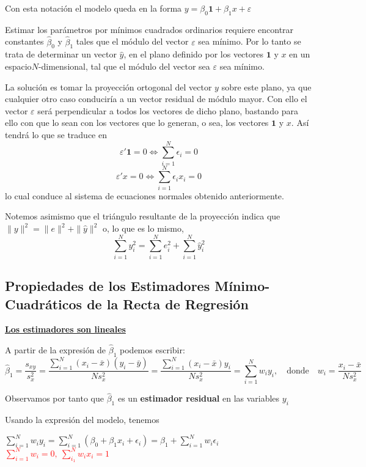 \documentclass[10pt,a4paper]{book}
\begin{document}
Con esta notación el modelo queda en la forma $y=\beta_0\mathbf{1}+\beta_1x+\varepsilon$

Estimar los parámetros por mínimos cuadrados ordinarios requiere encontrar constantes $\widehat{\beta}_0$ y $\widehat{\beta}_1$ tales que el módulo del vector $\varepsilon$ sea mínimo. Por lo tanto se trata de determinar un vector $\widehat{y}$, en el plano definido por los vectores $\mathbf{1}$ y $x$ en un espacio$N$-dimensional, tal que el módulo del vector sea $\varepsilon$ sea mínimo.

La solución es tomar la proyección ortogonal del vector $y$ sobre este plano, ya que cualquier otro caso conduciría a un vector residual de módulo mayor. Con ello el vector $\varepsilon$ será perpendicular a todos los vectores de dicho plano, bastando para ello con que lo sean con los vectores que lo generan, o sea, los vectores $\mathbf{1}$ y $x$. Así tendrá
lo que se traduce en $$\varepsilon'\mathbf{1}=0 \Leftrightarrow \sum^N_{i=1}\epsilon_i=0$$ $$\varepsilon'x=0 \Leftrightarrow \sum^N_{i=1}\epsilon_ix_i=0$$ lo cual conduce al sistema de ecuaciones normales obtenido anteriormente.

Notemos asimismo que el triángulo resultante de la proyección indica que $\parallel y\parallel^2=\parallel e\parallel ^2+\parallel \widehat{y}\parallel ^2$ o, lo que es lo mismo, $$\sum^N_{i=1}y^2_i=\sum^N_{i=1}e_i^2+\sum^N_{i=1}\widehat{y}_i^2$$
		\subsection{Propiedades de los Estimadores Mínimo-Cuadráticos de la Recta de Regresión}
\underline{\textbf{Los estimadores son lineales}}

A partir de la expresión de $\widehat{\beta}_1$ podemos escribir: $$\widehat{\beta}_1=\dfrac{s_{xy}}{s^2_x}=\dfrac{\displaystyle\sum^N_{i=1}(x_i-\bar{x})(y_i-\bar{y})}{Ns^2_x}=\dfrac{\displaystyle\sum^N_{i=1}(x_i-\bar{x})y_i}{Ns^2_x}=\displaystyle\sum^N_{i=1}w_iy_i,\quad \mathrm{donde}\quad w_i=\dfrac{x_i-\bar{x}}{Ns^2_x}$$

Observamos por tanto que $\widehat{\beta}_1$ es un \textbf{estimador residual} en las variables $y_i$

Usando la expresión del modelo, tenemos 
\begin{center}
$\displaystyle\sum^N_{i=1}w_iy_i=\displaystyle\sum^N_{i=1}(\beta_0+\beta_1x_i+\epsilon_i)=\beta_1+\displaystyle\sum^N_{i=1}w_i\epsilon_i\qquad$ \textcolor{red}{$\displaystyle\sum^N_{i=1}w_i=0,\: \displaystyle\sum^N_{i_1}w_ix_i=1$}
\end{center}
\end{document}
